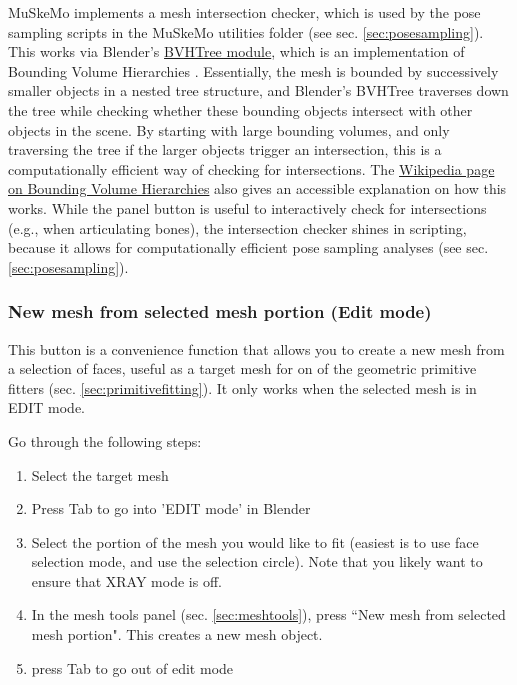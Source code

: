 \documentclass{article}
\begin{document}
MuSkeMo implements a mesh intersection checker, which is used by the pose sampling scripts in the MuSkeMo utilities folder (see sec. \ref{sec:posesampling}). This works via Blender's \href{https://docs.blender.org/api/current/mathutils.bvhtree.html}{BVHTree module}, which is an implementation of Bounding Volume Hierarchies \cite{ericsonBoundingVolumeHierarchies2005}. Essentially, the mesh is bounded by successively smaller objects in a nested tree structure, and Blender's BVHTree traverses down the tree while checking whether these bounding objects intersect with other objects in the scene. By starting with large bounding volumes, and only traversing the tree if the larger objects trigger an intersection, this is a computationally efficient way of checking for intersections. The \href{https://en.wikipedia.org/wiki/Bounding_volume_hierarchy}{Wikipedia page on Bounding Volume Hierarchies} also gives an accessible explanation on how this works. While the panel button is useful to interactively check for intersections (e.g., when articulating bones), the intersection checker shines in scripting, because it allows for computationally efficient pose sampling analyses (see sec. \ref{sec:posesampling}).

\subsubsection{New mesh from selected mesh portion (Edit mode)}
\label{sec:newmeshselportion}
This button is a convenience function that allows you to create a new mesh from a selection of faces, useful as a target mesh for on of the geometric primitive fitters (sec. \ref{sec:primitivefitting}). It only works when the selected mesh is in EDIT mode.

Go through the following steps:


\begin{enumerate}
\item Select the target mesh
\item Press Tab to go into 'EDIT mode' in Blender
\item Select the portion of the mesh you would like to fit (easiest is to use face selection mode, and use the selection circle). Note that you likely want to ensure that XRAY mode is off.
\item In the mesh tools panel (sec. \ref{sec:meshtools}), press ``New mesh from selected mesh portion". This creates a new mesh object.
\item press Tab to go out of edit mode
\end{enumerate}
\end{document}

